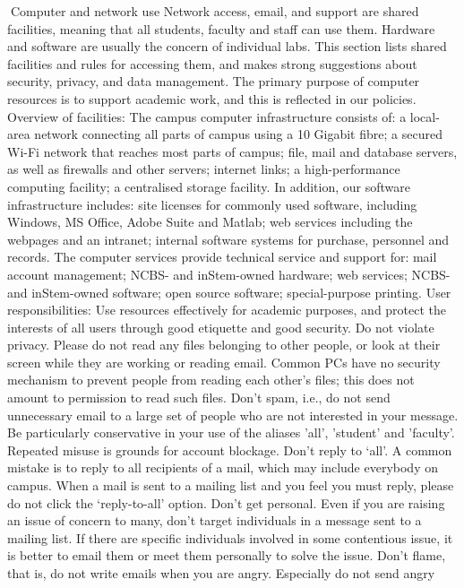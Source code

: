 \documentclass[a4paper,10pt]{article}
\begin{document}
Computer and network use
Network access, email, and support are shared facilities, meaning that all students, faculty
and staff can use them. Hardware and software are usually the concern of individual labs.
This section lists shared facilities and rules for accessing them, and makes strong
suggestions about security, privacy, and data management. The primary purpose of
computer resources is to support academic work, and this is reflected in our policies.
Overview of facilities: The campus computer infrastructure consists of: a local-area
network connecting all parts of campus using a 10 Gigabit fibre; a secured Wi-Fi network
that reaches most parts of campus; file, mail and database servers, as well as firewalls and
other servers; internet links; a high-performance computing facility; a centralised storage
facility. In addition, our software infrastructure includes: site licenses for commonly used
software, including Windows, MS Office, Adobe Suite and Matlab; web services including
the webpages and an intranet; internal software systems for purchase, personnel and records.
The computer services provide technical service and support for: mail account management;
NCBS- and inStem-owned hardware; web services; NCBS- and inStem-owned software;
open source software; special-purpose printing.
User responsibilities: Use resources effectively for academic purposes, and protect the
interests of all users through good etiquette and good security.
Do not violate privacy. Please do not read any files belonging to other people, or look at
their screen while they are working or reading email. Common PCs have no security
mechanism to prevent people from reading each other's files; this does not amount to
permission to read such files.
Don't spam, i.e., do not send unnecessary email to a large set of people who are not
interested in your message. Be particularly conservative in your use of the aliases 'all',
'student' and 'faculty'. Repeated misuse is grounds for account blockage.
Don’t reply to ‘all’. A common mistake is to reply to all recipients of a mail, which may
include everybody on campus. When a mail is sent to a mailing list and you feel you must
reply, please do not click the ‘reply-to-all’ option.
Don’t get personal. Even if you are raising an issue of concern to many, don't target
individuals in a message sent to a mailing list. If there are specific individuals involved in
some contentious issue, it is better to email them or meet them personally to solve the issue.
Don't flame, that is, do not write emails when you are angry. Especially do not send angry
\end{document}
